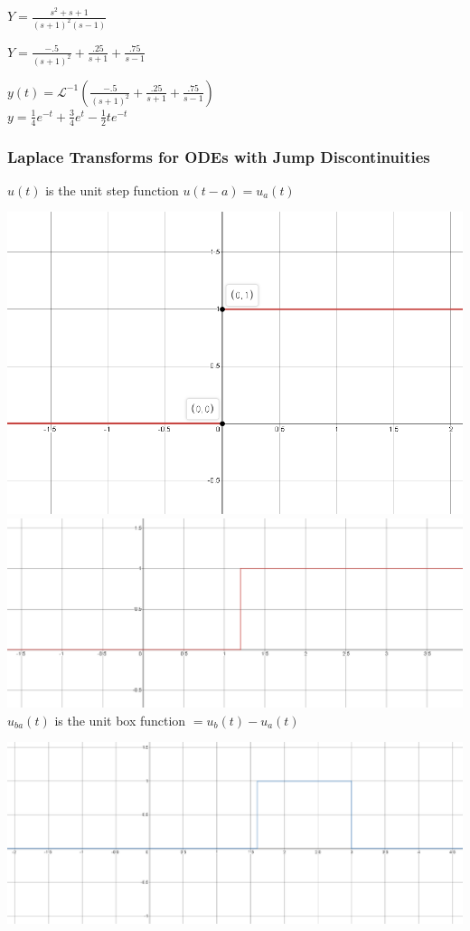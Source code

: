 \documentclass[12pt]{article}
\numberwithin{equation}{subsection}
\newcommand{\lap}{\mathscr{L}}
\newcommand{\inda}{\hspace{.5cm}}
\newcommand{\indb}{\hspace{1cm}}
\newcommand{\indd}{\hspace{2cm}}
\newcommand{\indf}{\hspace{3cm}}
\begin{document}
\indd $Y   = \frac{s^2+s+1}{(s+1)^2(s-1)}$

\indd $Y   = \frac{-.5}{(s+1)^2}+ \frac{.25}{s+1}+\frac{.75}{s-1}$


\indd $y(t) = \lap^{-1}\left(\frac{-.5}{(s+1)^2}+ \frac{.25}{s+1}+\frac{.75}{s-1}\right)$\\

\inda $ y= \frac{1}{4}e^{-t}+\frac{3}{4}e^t-\frac{1}{2} te^{-t} $

\subsubsection{Laplace Transforms for ODEs with Jump Discontinuities}
\indb $u(t)$ is the unit step function \indf  $u(t-a)=u_a(t)$

\includegraphics[scale=.25]{unit} \inda \includegraphics[scale=.25]{unita}\\



$u_{ba}(t)$ is the unit box function $=u_b(t)-u_a(t)$

\includegraphics[scale=.25]{unitb}
\end{document}
